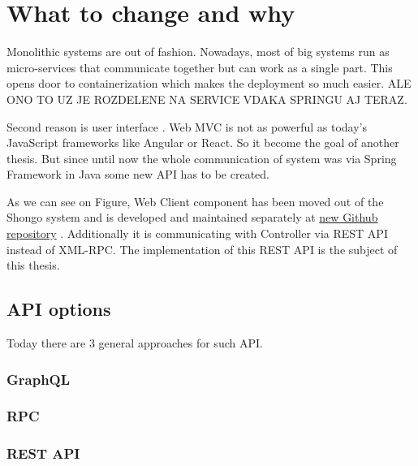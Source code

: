 \chapter{What to change and why}
Monolithic systems are out of fashion.
Nowadays, most of big systems run as micro-services that communicate together but can work as a single part.
This opens door to containerization which makes the deployment so much easier.
ALE ONO TO UZ JE ROZDELENE NA SERVICE VDAKA SPRINGU AJ TERAZ.

Second reason is user interface . Web MVC is not as powerful as today's JavaScript frameworks like Angular or React.
So it become the goal of another thesis. \cite{drobnakm}
But since until now the whole communication of system was via Spring Framework in Java some new API has to be created.

As we can see on Figure, Web Client component has been moved out of the Shongo system and is developed and maintained separately at \href{https://github.com/shongo/shongo-frontend}{new Github repository} \cite{drobnakm}. Additionally it is communicating with Controller via REST API instead of XML-RPC.
The implementation of this REST API is the subject of this thesis.

\section{API options}
Today there are 3 general approaches for such API.
\subsection{GraphQL}
\subsection{RPC}
\subsection{REST API}
